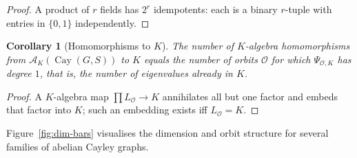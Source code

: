 \documentclass[12pt]{amsart}
\numberwithin{equation}{section}
\theoremstyle{plain}
\newtheorem{corollary}[theorem]{Corollary}
\theoremstyle{definition}
\DeclareMathOperator{\Cay}{Cay}
\newcommand{\calA}{\mathcal{A}}
\newcommand{\calO}{\mathcal{O}}
\begin{document}
\begin{proof}
A product of $r$ fields has $2^r$ idempotents: each is a binary $r$-tuple
with entries in $\{0, 1\}$ independently.
\end{proof}

\begin{corollary}[Homomorphisms to $K$]
\label{cor:homs}
The number of $K$-algebra homomorphisms from
$\calA_K(\Cay(G,S))$ to $K$ equals the number of orbits
$\calO$ for which $\Psi_{\calO,K}$ has degree $1$, that is,
the number of eigenvalues already in $K$.
\end{corollary}

\begin{proof}
A $K$-algebra map $\prod L_\calO \to K$ annihilates all but one factor and
embeds that factor into $K$; such an embedding exists iff $L_\calO = K$.
\end{proof}

Figure~\ref{fig:dim-bars} visualises the dimension and orbit structure for
several families of abelian Cayley graphs.
\end{document}

